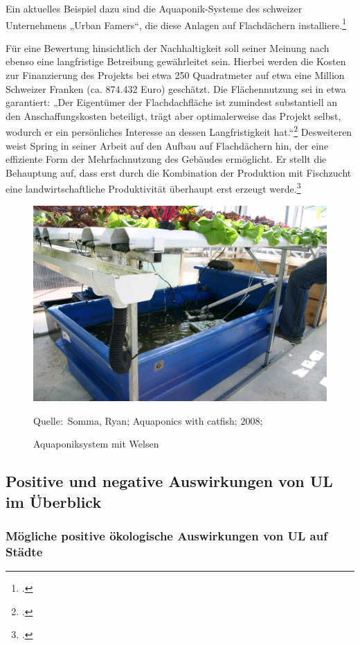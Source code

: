 \documentclass{scrartcl}
\newcommand*{\Bildquelle}[1]{\par\raggedleft\footnotesize Quelle:~#1}
\begin{document}
Ein aktuelles Beispiel dazu sind die Aquaponik-Systeme des schweizer Unternehmens „Urban Famers“, die diese Anlagen auf Flachdächern installiere.\footcites[Vgl.][S.26f]{Spring2012DerBasel-Stadt} 

Für eine Bewertung hinsichtlich der Nachhaltigkeit soll seiner Meinung nach ebenso eine langfristige Betreibung gewährleitet sein. Hierbei werden die Kosten zur Finanzierung des Projekts bei etwa 250 Quadratmeter auf etwa eine Million Schweizer Franken (ca. 874.432 Euro) geschätzt. Die Flächennutzung sei in etwa garantiert: „Der Eigentümer der Flachdachfläche ist zumindest substantiell an den Anschaffungskosten beteiligt, trägt aber optimalerweise das Projekt selbst, wodurch er ein persönliches Interesse an dessen Langfristigkeit hat.“\footcite[Vgl.][S.37]{Spring2012DerBasel-Stadt} Desweiteren weist Spring in seiner Arbeit auf den Aufbau auf Flachdächern hin, der eine effiziente Form der Mehrfachnutzung des Gebäudes ermöglicht. Er stellt die Behauptung auf, dass erst durch die Kombination der Produktion mit Fischzucht eine landwirtschaftliche Produktivität überhaupt erst erzeugt werde.\footcite[S.47]{Spring2012DerBasel-Stadt} 

\begin{figure}[htbp]
\centering
\caption{Aquaponiksystem mit Welsen}
\includegraphics[width=12cm]{image_folder/Aquaponics_with_catfish.jpg}
\Bildquelle{Somma, Ryan; Aquaponics with catfish; 2008;}
\label{fig:aquaponik}
\end{figure}

\subsection{Positive und negative Auswirkungen von UL im Überblick}
     \subsubsection{Mögliche positive ökologische Auswirkungen von UL auf Städte}  
\end{document}
